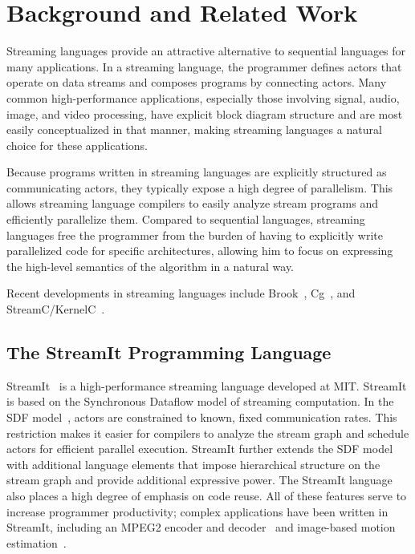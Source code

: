 \chapter{Background and Related Work}\label{ch:bg}

Streaming languages provide an attractive alternative to sequential languages for many applications. In a streaming language, the programmer defines actors that operate on data streams and composes programs by connecting actors. Many common high-performance applications, especially those involving signal, audio, image, and video processing, have explicit block diagram structure and are most easily conceptualized in that manner, making streaming languages a natural choice for these applications.

Because programs written in streaming languages are explicitly structured as communicating actors, they typically expose a high degree of parallelism. This allows streaming language compilers to easily analyze stream programs and efficiently parallelize them. Compared to sequential languages, streaming languages free the programmer from the burden of having to explicitly write parallelized code for specific architectures, allowing him to focus on expressing the high-level semantics of the algorithm in a natural way.

Recent developments in streaming languages include Brook~\cite{brook}, Cg~\cite{cg}, and StreamC/KernelC~\cite{streamc}.

\section{The StreamIt Programming Language}\label{ch:bg:str}

StreamIt~\cite{asplos02} is a high-performance streaming language developed at MIT. StreamIt is based on the Synchronous Dataflow model of streaming computation. In the SDF model~\cite{sdf}, actors are constrained to known, fixed communication rates. This restriction makes it easier for compilers to analyze the stream graph and schedule actors for efficient parallel execution. StreamIt further extends the SDF model with additional language elements that impose hierarchical structure on the stream graph and provide additional expressive power. The StreamIt language also places a high degree of emphasis on code reuse. All of these features serve to increase programmer productivity; complex applications have been written in StreamIt, including an MPEG2 encoder and decoder~\cite{mpeg} and image-based motion estimation~\cite{basier}.

